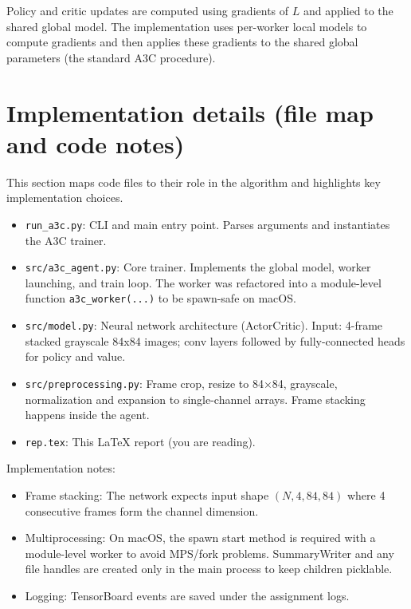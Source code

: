 \documentclass[11pt]{article}
\begin{document}
Policy and critic updates are computed using gradients of \(L\) and applied to the shared global model. The implementation uses per-worker local models to compute gradients and then applies these gradients to the shared global parameters (the standard A3C procedure).

\section{Implementation details (file map and code notes)}
This section maps code files to their role in the algorithm and highlights key implementation choices.

\begin{itemize}
  \item \texttt{run\_a3c.py}: CLI and main entry point. Parses arguments and instantiates the A3C trainer.
  \item \texttt{src/a3c\_agent.py}: Core trainer. Implements the global model, worker launching, and train loop. The worker was refactored into a module-level function \texttt{a3c\_worker(...)} to be spawn-safe on macOS.
  \item \texttt{src/model.py}: Neural network architecture (ActorCritic). Input: 4-frame stacked grayscale 84x84 images; conv layers followed by fully-connected heads for policy and value.
  \item \texttt{src/preprocessing.py}: Frame crop, resize to 84×84, grayscale, normalization and expansion to single-channel arrays. Frame stacking happens inside the agent.
  \item \texttt{rep.tex}: This LaTeX report (you are reading).
\end{itemize}

Implementation notes:
\begin{itemize}
  \item Frame stacking: The network expects input shape \((N,4,84,84)\) where 4 consecutive frames form the channel dimension.
  \item Multiprocessing: On macOS, the spawn start method is required with a module-level worker to avoid MPS/fork problems. SummaryWriter and any file handles are created only in the main process to keep children picklable.
  \item Logging: TensorBoard events are saved under the assignment logs.
\end{itemize}
\end{document}
